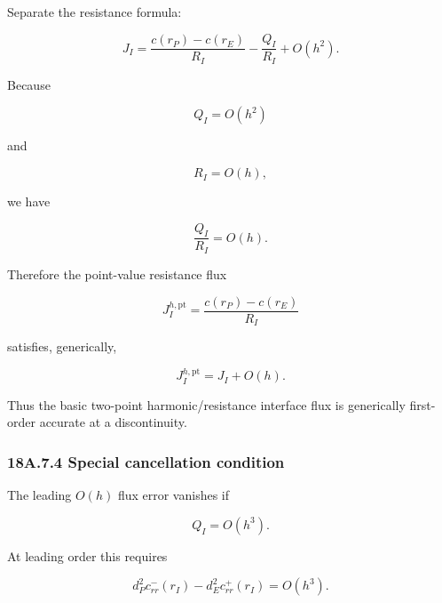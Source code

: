 \documentclass[11pt,a4paper]{article}
\begin{document}
Separate the resistance formula:

\begin{equation}
J_I
=
\frac{
c(r_P)-c(r_E)
}{
R_I
}
-
\frac{Q_I}{R_I}
+
O(h^2).
\tag{TRISO-ACC-192}
\label{eq:triso-acc-192}
\end{equation}

Because

\begin{equation}
Q_I=O(h^2)
\tag{TRISO-ACC-193}
\label{eq:triso-acc-193}
\end{equation}

and

\begin{equation}
R_I=O(h),
\tag{TRISO-ACC-194}
\label{eq:triso-acc-194}
\end{equation}

we have

\begin{equation}
\frac{Q_I}{R_I}=O(h).
\tag{TRISO-ACC-195}
\label{eq:triso-acc-195}
\end{equation}

Therefore the point-value resistance flux

\begin{equation}
J_I^{h,\mathrm{pt}}
=
\frac{
c(r_P)-c(r_E)
}{
R_I
}
\tag{TRISO-ACC-196}
\label{eq:triso-acc-196}
\end{equation}

satisfies, generically,

\begin{equation}
\boxed{
J_I^{h,\mathrm{pt}}
=
J_I
+
O(h).
}
\tag{TRISO-ACC-197}
\label{eq:triso-acc-197}
\end{equation}

Thus the basic two-point harmonic/resistance interface flux is generically first-order accurate at a discontinuity.

\subsubsection*{18A.7.4 Special cancellation condition}

The leading $O(h)$ flux error vanishes if

\begin{equation}
Q_I=O(h^3).
\tag{TRISO-ACC-198}
\label{eq:triso-acc-198}
\end{equation}

At leading order this requires

\begin{equation}
d_P^2c_{rr}^-(r_I)
-
d_E^2c_{rr}^+(r_I)
=
O(h^3).
\tag{TRISO-ACC-199}
\label{eq:triso-acc-199}
\end{equation}
\end{document}
